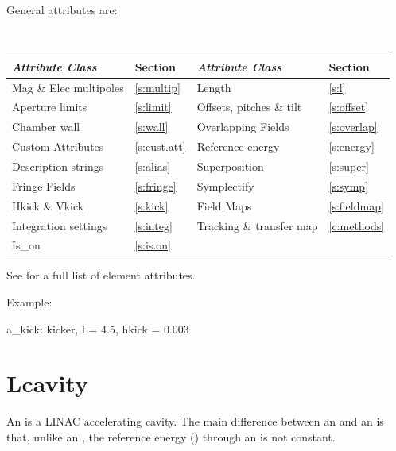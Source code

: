 General  attributes are:
\begin{center}
\tt
\begin{tabular}{llll} \toprule
  {\sl Attribute Class}      & Section           & {\sl Attribute Class}      & Section          \\ \midrule
  Mag \& Elec multipoles     & \ref{s:multip}    & Length                     & \ref{s:l}        \\
  Aperture limits            & \ref{s:limit}     & Offsets, pitches \& tilt   & \ref{s:offset}   \\
  Chamber wall               & \ref{s:wall}      & Overlapping Fields         & \ref{s:overlap}  \\
  Custom Attributes          & \ref{s:cust.att}  & Reference energy           & \ref{s:energy}   \\ 
  Description strings        & \ref{s:alias}     & Superposition              & \ref{s:super}    \\
  Fringe Fields              & \ref{s:fringe}    & Symplectify                & \ref{s:symp}     \\
  Hkick \& Vkick             & \ref{s:kick}      & Field Maps                 & \ref{s:fieldmap} \\
  Integration settings       & \ref{s:integ}     & Tracking \& transfer map   & \ref{c:methods}  \\ 
  Is_on                      & \ref{s:is.on}     &                            &                  \\
  \bottomrule
\end{tabular}
\end{center}
\toffset
See  for a full list of element attributes.

Example:
\begin{example}
  a_kick: kicker, l = 4.5, hkick = 0.003
\end{example}

\section{Lcavity}
\label{s:lcav}

An  is a LINAC accelerating cavity.  The main difference between an
 and an  is that, unlike an , the reference energy
() through an  is not constant.

